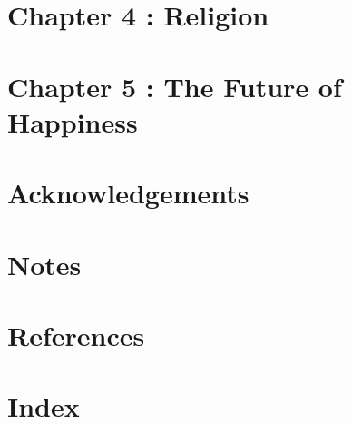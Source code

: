 \documentclass[a4paper,12pt]{extbook}
\begin{document}
\newpage
\section{Chapter 4 : Religion}

\newpage
\section{Chapter 5 : The Future of Happiness}

\newpage
\section{Acknowledgements}

\newpage
\section{Notes}

\newpage
\section{References}

\newpage
\section{Index}
\end{document}
